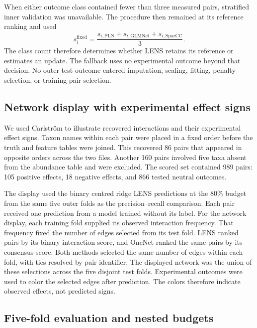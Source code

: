 \documentclass[11pt]{article}
\begin{document}
When either outcome class contained fewer than three measured pairs, stratified inner validation was unavailable.
The procedure then remained at its reference ranking and used
\begin{equation}
s_i^{\mathrm{fixed}}=\frac{s_{i,\mathrm{PLN}}+s_{i,\mathrm{GLMNet}}+s_{i,\mathrm{SparCC}}}{3}.
\label{eq:fixed-score}
\end{equation}
The class count therefore determines whether LENS retains its reference or estimates an update.
The fallback uses no experimental outcome beyond that decision.
No outer test outcome entered imputation, scaling, fitting, penalty selection, or training pair selection.

\subsection{Network display with experimental effect signs}

We used Carlstr\"om to illustrate recovered interactions and their experimental effect signs.
Taxon names within each pair were placed in a fixed order before the truth and feature tables were joined.
This recovered 86 pairs that appeared in opposite orders across the two files.
Another 160 pairs involved five taxa absent from the abundance table and were excluded.
The scored set contained 989 pairs: 105 positive effects, 18 negative effects, and 866 tested neutral outcomes.

The display used the binary centred ridge LENS predictions at the 80\% budget from the same five outer folds as the precision--recall comparison.
Each pair received one prediction from a model trained without its label.
For the network display, each training fold supplied its observed interaction frequency.
That frequency fixed the number of edges selected from its test fold.
LENS ranked pairs by its binary interaction score, and OneNet ranked the same pairs by its consensus score.
Both methods selected the same number of edges within each fold, with ties resolved by pair identifier.
The displayed network was the union of these selections across the five disjoint test folds.
Experimental outcomes were used to color the selected edges after prediction.
The colors therefore indicate observed effects, not predicted signs.

\subsection{Five-fold evaluation and nested budgets}
\end{document}

